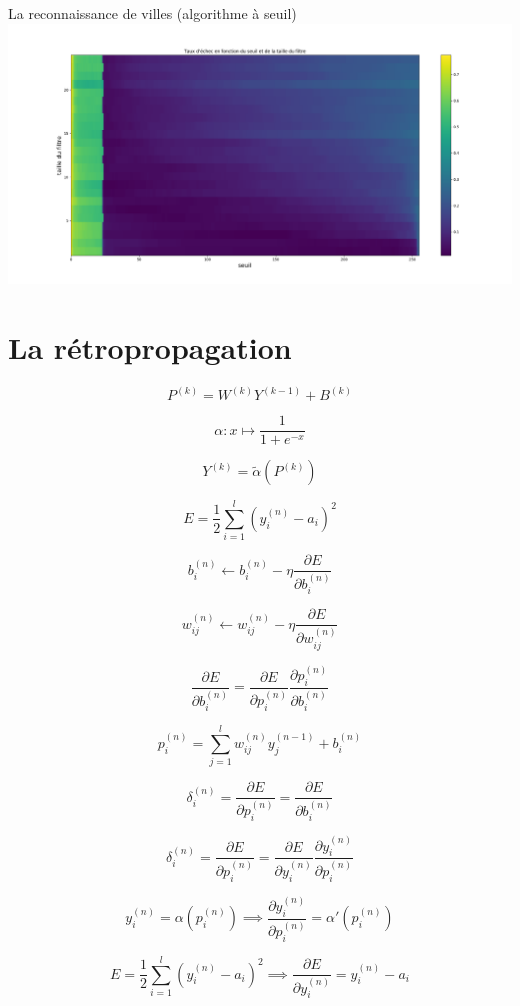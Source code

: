 \documentclass[ignorenonframetext,]{beamer}
\begin{document}
\begin{frame}{La reconnaissance de villes (algorithme à seuil)}
\includegraphics{filtre_vs_seuil.png}
\end{frame}

\section{La rétropropagation}
\frame{\sectionpage}
\begin{frame}{}

\[ P^{(k)} = W^{(k)}Y^{(k-1)}+B^{(k)}  \]

\[ \alpha : x \mapsto \frac{1}{1+e^{-x}} \]

\[ Y^{(k)} = \tilde\alpha(P^{(k)}) \]

\[ E = \frac{1}{2} \sum_{i=1}^l (y_i^{(n)}-a_i)^2 \]

\end{frame}

\begin{frame}{}

\[ b_i^{(n)} \longleftarrow b_i^{(n)} - \eta \frac{\partial{E}}{\partial{b_i^{(n)}}} \]

\[ w_{ij}^{(n)} \longleftarrow w_{ij}^{(n)} - \eta \frac{\partial{E}}{\partial{w_{ij}^{(n)}}} \]

\[ \frac{\partial{E}}{\partial{b_i^{(n)}}} = \frac{\partial{E}}{\partial{p_i^{(n)}}} \frac{\partial{p_i^{(n)}}}{\partial{b_i^{(n)}}} \]

\[ p_i^{(n)} = \sum_{j=1}^l w_{ij}^{(n)} y_j^{(n-1)} + b_i^{(n)} \]

\end{frame}

\begin{frame}{}

\[ \delta_i^{(n)} = \frac{\partial{E}}{\partial{p_i^{(n)}}} = \frac{\partial{E}}{\partial{b_i^{(n)}}} \]

\[ \delta_i^{(n)} = \frac{\partial{E}}{\partial{p_i^{(n)}}} = \frac{\partial{E}}{\partial{y_i^{(n)}}} \frac{\partial{y_i^{(n)}}}{\partial{p_i^{(n)}}} \]

\[ y_i^{(n)} = \alpha(p_i^{(n)}) \implies \frac{\partial{y_i^{(n)}}}{\partial{p_i^{(n)}}} = \alpha'(p_i^{(n)}) \]

\[ E = \frac{1}{2} \sum_{i=1}^l (y_i^{(n)}-a_i)^2 \implies \frac{\partial{E}}{\partial{y_i^{(n)}}} = y_i^{(n)} - a_i \]

\end{frame}
\end{document}
